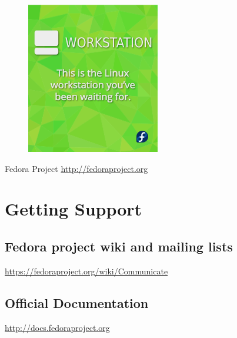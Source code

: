 \documentclass[
letterpaper,
10pt
]{leaflet}
\begin{document}
\vspace{1.5cm}
\begin{figure}[h]
  \includegraphics[keepaspectratio,width=\textwidth]{Fedora-workstation-v5a-infinity.png}
\end{figure}
\newpage

\begin{center}
  {\color{FedoraBlue}
  \LARGE{Fedora Project\vspace{1cm}}
  \Large{\href{http://fedoraproject.org}{http://fedoraproject.org}}
}
\end{center}

\section{\textcolor{FedoraBlue}{Getting Support}}
\subsection{Fedora project wiki and mailing lists}
\href{https://fedoraproject.org/wiki/Communicate}{https://fedoraproject.org/wiki/Communicate}

\subsection{Official Documentation}
\href{http://docs.fedoraproject.org}{http://docs.fedoraproject.org}
\end{document}
